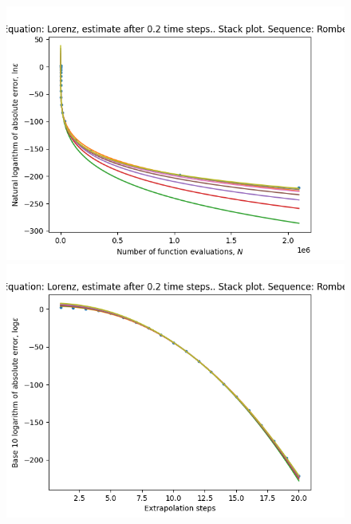 \begin{figure}[H]
\centering
\begin{minipage}{0.45\textwidth}
\centering
\includegraphics[scale=0.45]{emr_plots/lorenz_02_hp_romberg_stack.png}
\end{minipage}
\begin{minipage}{0.45\textwidth}
\centering
\includegraphics[scale=0.45]{emr_plots/lorenz_02_hp_romberg_steps_stack.png}
\end{minipage}
\end{figure}

